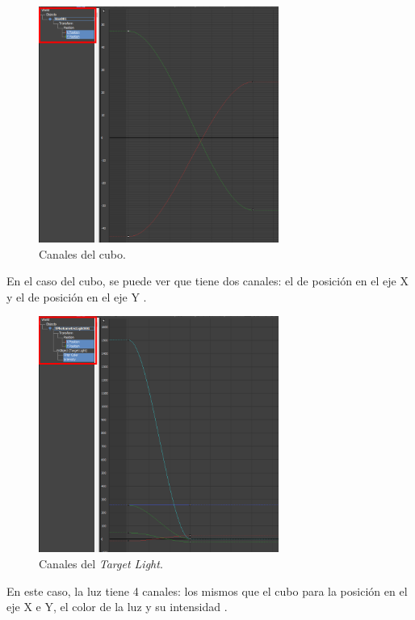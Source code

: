 \documentclass{article}
\begin{document}
\begin{figure}[H]
    \centering
    \includegraphics[width=0.7\textwidth]{imagenes/11.png}
    \caption{Canales del cubo.}
\end{figure}

En el caso del cubo, se puede ver que tiene dos canales: el de posición en el eje X y el de posición en el eje Y \cite{explicacion}.

\begin{figure}[H]
    \centering
    \includegraphics[width=0.7\textwidth]{imagenes/12.png}
    \caption{Canales del \textit{Target Light}.}
\end{figure}

En este caso, la luz tiene 4 canales: los mismos que el cubo para la posición en el eje X e Y, el color de la luz y su intensidad \cite{explicacion}.
\end{document}
